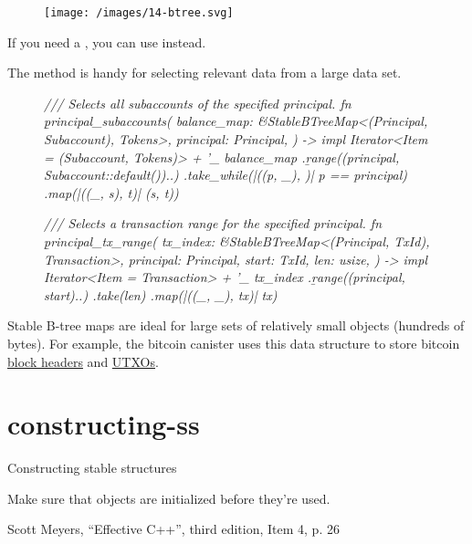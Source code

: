 \documentclass{article}
\begin{document}
\begin{figure}[grayscale-diagram]
  \texttt{[image: /images/14-btree.svg]}
\end{figure}

If you need a , you can use  instead.

The  method is handy for selecting relevant data from a large data set.

\begin{figure}
\label{range-scan-example}
\begin{code}[rust]
\em{/// Selects all subaccounts of the specified principal.}
fn \b{principal_subaccounts}(
  balance_map: &StableBTreeMap<(Principal, Subaccount), Tokens>,
  principal: Principal,
) -> impl Iterator<Item = (Subaccount, Tokens)> + '_ {
  balance_map
    .\b{range}((principal, Subaccount::default())..)
    .take_while(|((p, _), )| p == principal)
    .map(|((_, s), t)| (s, t))
}

\em{/// Selects a transaction range for the specified principal.}
fn \b{principal_tx_range}(
  tx_index: &StableBTreeMap<(Principal, TxId), Transaction>,
  principal: Principal,
  start: TxId,
  len: usize,
) -> impl Iterator<Item = Transaction> + '_ {
  tx_index
    .\b{range}((principal, start)..)
    .take(len)
    .map(|((_, _), tx)| tx)
}
\end{code}
\end{figure}

Stable B-tree maps are ideal for large sets of relatively small objects (hundreds of bytes).
For example, the bitcoin canister uses this data structure to store bitcoin \href{https://github.com/dfinity/bitcoin-canister/blob/9242d5f9a784ac115c2042fd09705dd9321ff7b7/canister/src/block_header_store.rs#L13}{block headers} and \href{https://github.com/dfinity/bitcoin-canister/blob/9242d5f9a784ac115c2042fd09705dd9321ff7b7/canister/src/utxo_set/utxos.rs}{UTXOs}.

\section{constructing-ss}{Constructing stable structures}
\epigraph{
  Make sure that objects are initialized before they're used.
}{Scott Meyers, ``Effective C++'', third edition, Item 4, p. 26}
\end{document}
